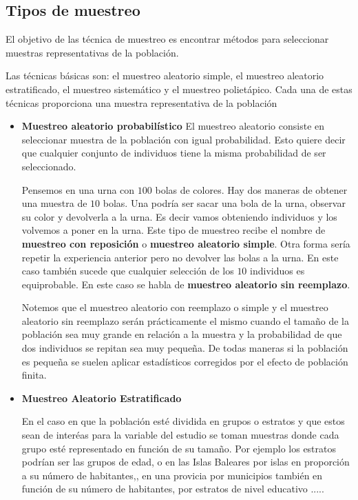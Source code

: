 \documentclass[12pt]{report}
\begin{document}
\subsection{Tipos de muestreo}


El objetivo de las técnica de muestreo es encontrar métodos para seleccionar muestras representativas de la población.

Las técnicas básicas son: el muestreo aleatorio simple, el muestreo aleatorio estratificado, el muestreo sistemático y el muestreo polietápico. Cada una de estas técnicas proporciona una muestra representativa de la población

\begin{itemize}
\item \textbf{Muestreo aleatorio probabilístico}
El muestreo aleatorio consiste en seleccionar muestra de la población con igual probabilidad. Esto quiere decir que cualquier conjunto de individuos tiene la misma probabilidad de ser seleccionado. 

Pensemos en una urna con $100$ bolas de colores. Hay dos maneras de obtener una muestra de $10$ bolas. Una podría ser sacar una bola de la urna, observar su color y devolverla a la urna. Es decir vamos obteniendo individuos y los volvemos a poner en la urna. Este tipo de muestreo recibe el nombre de \textbf{muestreo con reposición} o \textbf{muestreo aleatorio simple}. Otra forma sería repetir la experiencia anterior pero no devolver las bolas a la urna. En este caso también sucede que cualquier selección de los $10$ individuos es equiprobable. En este caso se habla de \textbf{muestreo aleatorio sin reemplazo}.


Notemos que el muestreo aleatorio con reemplazo o simple y el muestreo aleatorio sin reemplazo serán prácticamente el mismo  cuando el tamaño de la población sea muy grande en relación a la muestra y la probabilidad de que dos individuos se repitan sea muy pequeña. De todas maneras si la población es pequeña se suelen aplicar estadísticos corregidos por el efecto de población finita.

\item \textbf{Muestreo Aleatorio Estratificado}

En el caso en que la población  esté dividida en grupos o estratos  y que estos sean de interéas para la variable del estudio se toman muestras donde cada grupo esté representado en función de su tamaño. Por ejemplo los estratos podrían ser las grupos  de edad, o en las Islas Baleares por islas en proporción a  su número de habitantes,, en una provicia por municipios también en función de su número de habitantes, por estratos de nivel educativo .....



\end{itemize}
\end{document}
